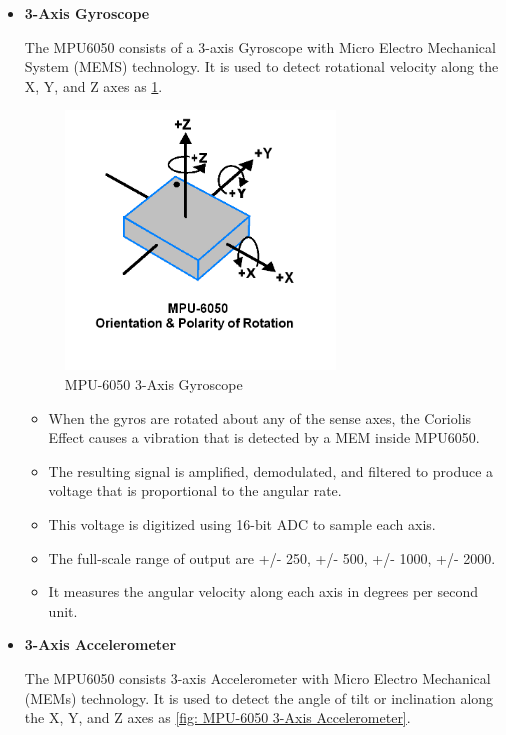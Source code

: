 \begin{itemize}

    \item \textbf{3-Axis Gyroscope}
    
    The MPU6050 consists of a 3-axis Gyroscope with Micro Electro Mechanical System (MEMS) technology. It is used to detect rotational velocity along the X, Y, and Z axes as \ref{fig: MPU-6050 3-Axis Gyroscope}.
    
    \begin{figure}[h!]
         \centering
             \centering
             \includegraphics[scale=0.5]{./Figures/AppendixB/acc.png}
             \caption{MPU-6050 3-Axis Gyroscope}
             \label{fig: MPU-6050 3-Axis Gyroscope}
    \end{figure}


\begin{itemize}
        \item When the gyros are rotated about any of the sense axes, the Coriolis Effect causes a vibration that is detected by a MEM inside MPU6050.
        \item The resulting signal is amplified, demodulated, and filtered to produce a voltage that is proportional to the angular rate. 
        \item This voltage is digitized using 16-bit ADC to sample each axis.
        \item The full-scale range of output are +/- 250, +/- 500, +/- 1000, +/- 2000.
        \item It measures the angular velocity along each axis in degrees per second unit.
    \end{itemize}

    \item \textbf{3-Axis Accelerometer}
    
    The MPU6050 consists 3-axis Accelerometer with Micro Electro Mechanical (MEMs) technology. It is used to detect the angle of tilt or inclination along the X, Y, and Z axes as \ref{fig: MPU-6050 3-Axis Accelerometer}.
    

\end{itemize}
